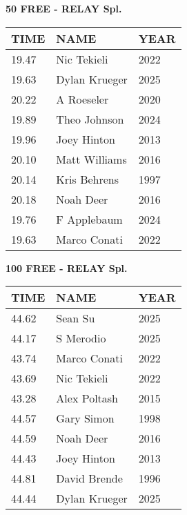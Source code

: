 \begin{center}
\begin{minipage}[t]{0.7\textwidth}
\centering
\textbf{50 FREE - RELAY Spl.}\\[0.05cm]
\begin{tabular}{@{}p{1.8cm}p{2.8cm}p{1.2cm}@{}}
\hline
\textbf{TIME} & \textbf{NAME} & \textbf{YEAR} \\
\hline
19.47 & Nic Tekieli & 2022 \\
19.63 & Dylan Krueger & 2025 \\
20.22 & A Roeseler & 2020 \\
19.89 & Theo Johnson & 2024 \\
19.96 & Joey Hinton & 2013 \\
20.10 & Matt Williams & 2016 \\
20.14 & Kris Behrens & 1997 \\
20.18 & Noah Deer & 2016 \\
19.76 & F Applebaum & 2024 \\
19.63 & Marco Conati & 2022 \\
\hline
\end{tabular}
\end{minipage}
\end{center}

\vspace{0.4cm}

\begin{center}
\begin{minipage}[t]{0.7\textwidth}
\centering
\textbf{100 FREE - RELAY Spl.}\\[0.05cm]
\begin{tabular}{@{}p{1.8cm}p{2.8cm}p{1.2cm}@{}}
\hline
\textbf{TIME} & \textbf{NAME} & \textbf{YEAR} \\
\hline
44.62 & Sean Su & 2025 \\
44.17 & S Merodio & 2025 \\
43.74 & Marco Conati & 2022 \\
43.69 & Nic Tekieli & 2022 \\
43.28 & Alex Poltash & 2015 \\
44.57 & Gary Simon & 1998 \\
44.59 & Noah Deer & 2016 \\
44.43 & Joey Hinton & 2013 \\
44.81 & David Brende & 1996 \\
44.44 & Dylan Krueger & 2025 \\
\hline
\end{tabular}
\end{minipage}
\end{center}


